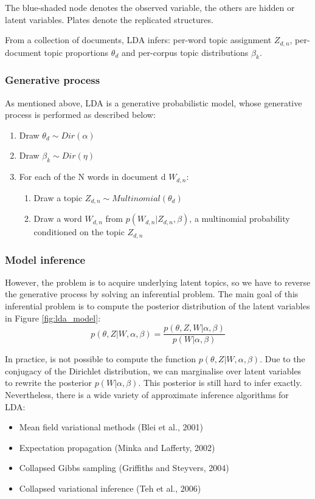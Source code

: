\documentclass[11pt]{article}
\begin{document}
The blue-shaded node denotes the observed variable, the others are hidden or latent variables. Plates denote the replicated structures.

From a collection of documents, LDA infers: per-word topic assignment $Z_{d,n}$, per-document topic proportions $\theta_d$ and per-corpus topic distributions $\beta_k$.

\subsubsection{Generative process}

As mentioned above, LDA is a generative probabilistic model, whose generative process is performed as described below:
\begin{enumerate}
	\item Draw $\theta_d \sim Dir(\alpha)$
	\item Draw $\beta_k \sim Dir(\eta)$
	\item For each of the N words in document d $W_{d,n}$:
	\begin{enumerate}
		\item Draw a topic $Z_{d,n} \sim Multinomial(\theta_d)$
		\item Draw a word $W_{d,n}$ from $p(W_{d,n}|Z_{d,n},\beta)$, a multinomial probability conditioned on the topic $Z_{d,n}$
	\end{enumerate}
\end{enumerate}

\subsubsection{Model inference}
However, the problem is to acquire underlying latent topics, so we have to reverse the generative process by solving an inferential problem. The main goal of this inferential problem is to compute the posterior distribution of the latent variables in Figure \ref{fig:lda_model}:
\[p(\theta,Z|W,\alpha,\beta)=\frac{p(\theta,Z,W|\alpha,\beta)}{p(W|\alpha,\beta)}\]

In practice, is not possible to compute the function $p(\theta,Z|W,\alpha,\beta)$. Due to the conjugacy of the Dirichlet distribution, we can marginalise over latent variables to rewrite the posterior $p(W|\alpha,\beta)$. This posterior is still hard to infer exactly. Nevertheless, there is a wide variety of approximate inference algorithms for LDA:
\begin{itemize}
	\item Mean field variational methods \cite{blei2004variational} (Blei et al., 2001)
	\item Expectation propagation \cite{minka2002expectation} (Minka and Lafferty, 2002)
	\item Collapsed Gibbs sampling \cite{griffiths2004finding} (Griffiths and Steyvers, 2004)
	\item Collapsed variational inference \cite{teh2006collapsed} (Teh et al., 2006)
\end{itemize}
\end{document}
